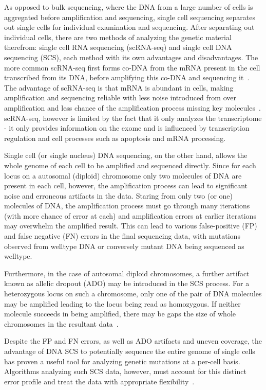 \documentclass[../../main.tex]{subfiles}
\begin{document}
As opposed to bulk sequencing, where the DNA from a large number of cells is aggregated before amplification and sequencing, single cell sequencing separates out single cells for individual examination and sequencing.
After separating out individual cells, there are two methods of analyzing the genetic material therefrom: single cell RNA sequencing (scRNA-seq) and single cell DNA sequencing (SCS), each method with its own advantages and disadvantages.
The more common scRNA-seq first forms co-DNA from the mRNA present in the cell transcribed from its DNA, before amplifying this co-DNA and sequencing it~\cite{rnaseq}.
The advantage of scRNA-seq is that mRNA is abundant in cells, making amplification and sequencing reliable with less noise introduced from over amplification and less chance of the amplification process missing key molecules~\cite{SCSadvance, onecelltime}.
scRNA-seq, however is limited by the fact that it only analyzes the transcriptome - it only provides information on the exome and is influenced by transcription regulation and cell processes such as apoptosis and mRNA processing\cite{cellity, biochemistry}.

Single cell (or single nucleus) DNA sequencing, on the other hand, allows the whole genome of each cell to be amplified and sequenced directly.
Since for each locus on a autosomal (diploid) chromosome only two molecules of DNA are present in each cell, however, the amplification process can lead to significant noise and erroneous artifacts in the data.
Staring from only two (or one) molecules of DNA, the amplification process must go through many iterations (with more chance of error at each) and amplification errors at earlier iterations may overwhelm the amplified result.
This can lead to various false-positive (FP) and false negative (FN) errors in the final sequencing data, with mutations observed from welltype DNA or conversely mutant DNA being sequenced as welltype.

Furthermore, in the case of autosomal diploid chromosomes, a further artifact known as allelic dropout (ADO) may be introduced in the SCS process.
For a heterozygous locus on such a chromosome, only one of the pair of DNA molecules may be amplified leading to the locus being read as homozygous.
If neither molecule succeeds in being amplified, there may be gaps the size of whole chromosomes in the resultant data~\cite{monovar, sciphi, SCSadvance}.

Despite the FP and FN errors, as well as ADO artifacts and uneven coverage, the advantage of DNA SCS to potentially sequence the entire genome of single cells has proven a useful tool for analyzing genetic mutations at a per-cell basis.
Algorithms analyzing such SCS data, however, must account for this distinct error profile and treat the data with appropriate flexibility~\cite{monovar, sciphi}.
\end{document}
